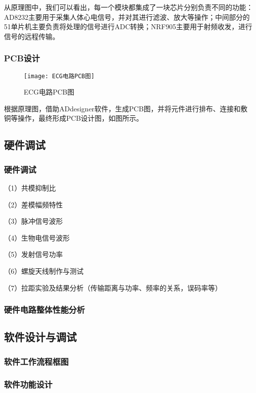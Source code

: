 \documentclass{zjureport}
\begin{document}
	从原理图中，我们可以看出，每一个模块都集成了一块芯片分别负责不同的功能：AD8232主要用于采集人体心电信号，并对其进行滤波、放大等操作；中间部分的51单片机主要负责将处理的信号进行ADC转换；NRF905主要用于射频收发，进行信号的远程传输。
	
	\subsubsection{PCB设计}
	
	\begin{figure}[H]
		\centering%
		\texttt{[image: ECG电路PCB图]}
		\caption{ECG电路PCB图}%
		\label{ECG电路PCB图}%
	\end{figure}
	
	根据原理图，借助ADdesigner软件，生成PCB图，并将元件进行排布、连接和敷铜等操作，最终形成PCB设计图，如图所示。
	
	\subsection{硬件调试}
	
	\subsubsection{硬件调试}
	
	（1）共模抑制比
	
	（2）差模幅频特性
	
	（3）脉冲信号波形
	
	（4）生物电信号波形
	
	（5）发射信号功率
	
	（6）螺旋天线制作与测试
	
	（7）拉距实验及结果分析（传输距离与功率、频率的关系，误码率等）
	
	\subsubsection{硬件电路整体性能分析}
	
	\subsection{软件设计与调试}
	
	\subsubsection{软件工作流程框图}
	
	\subsubsection{软件功能设计}
	
\end{document}
